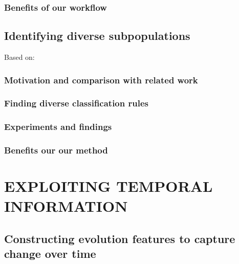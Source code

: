 \documentclass[
]{book}
\begin{document}
\hypertarget{benefits-of-our-workflow}{%
\section{Benefits of our workflow}\label{benefits-of-our-workflow}}

\hypertarget{sdclu}{%
\chapter{Identifying diverse subpopulations}\label{sdclu}}

Based on: \autocite{Niemann:CBMS2017}

\hypertarget{motivation-and-comparison-with-related-work-1}{%
\section{Motivation and comparison with related work}\label{motivation-and-comparison-with-related-work-1}}

\hypertarget{finding-diverse-classification-rules}{%
\section{Finding diverse classification rules}\label{finding-diverse-classification-rules}}

\hypertarget{experiments-and-findings-1}{%
\section{Experiments and findings}\label{experiments-and-findings-1}}

\hypertarget{benefits-our-our-method}{%
\section{Benefits our our method}\label{benefits-our-our-method}}

\hypertarget{part-exploiting-temporal-information}{%
\part{EXPLOITING TEMPORAL INFORMATION}\label{part-exploiting-temporal-information}}

\hypertarget{evo}{%
\chapter{Constructing evolution features to capture change over time}\label{evo}}
\end{document}
